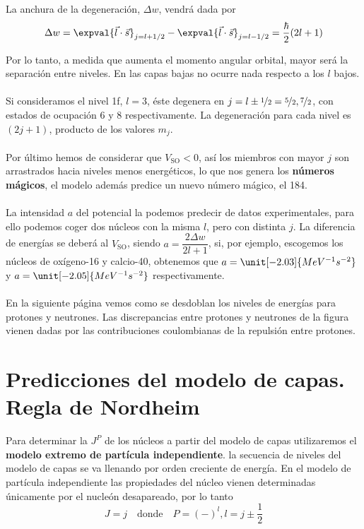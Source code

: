 La anchura de la degeneración, $\Delta w$, vendrá dada por 
\begin{equation*}
   \Delta w= \expval{\vec{l}\cdot \vec{s}}_{j=l+1/2}-\expval{\vec{l}\cdot \vec{s}}_{j=l-1/2}=\frac{\hbar}{2}(2l+1)
\end{equation*}

Por lo tanto, a medida que aumenta el momento angular orbital, mayor será la separación entre niveles. En las capas bajas no ocurre nada respecto a los $l$ bajos.\\\\ Si consideramos el nivel 1f, $l=3$, éste degenera en $j=l \pm \nicefrac{1}{2}=\nicefrac{5}{2},\nicefrac{7}{2}$, con estados de ocupación 6 y 8 respectivamente. La degeneración para cada nivel es $(2j+1)$, producto de los valores $m_j$.\\\\
Por último hemos de considerar que $V_\mathrm{SO}<0$, así los miembros con mayor $j$ son arrastrados hacia niveles menos energéticos, lo que nos genera los \textbf{números mágicos}, el modelo además predice un nuevo número mágico, el 184.\\\\ 
La intensidad $a$ del potencial la podemos predecir de datos experimentales, para ello podemos coger dos núcleos con la misma $l$, pero con distinta $j$. La diferencia de energías se deberá al $V_\mathrm{SO}$, siendo $a=\dfrac{2\Delta w}{2l+1}$, si, por ejemplo, escogemos los núcleos de oxígeno-16 y calcio-40, obtenemos que $a=\unit[-2.03]{MeV^{-1}s^{-2}}$ y $a=\unit[-2.05]{MeV^{-1}s^{-2}}$ respectivamente. \\\\
En la siguiente página vemos como se desdoblan los niveles de energías para protones y neutrones. Las discrepancias entre protones y neutrones de la figura vienen dadas por las contribuciones coulombianas de la repulsión entre protones.


\section{Predicciones del modelo de capas. Regla de Nordheim}
Para determinar la $J^P$ de los núcleos a partir del modelo de capas utilizaremos el \textbf{modelo extremo de partícula independiente}. la secuencia de niveles del modelo de capas se va llenando por orden creciente de energía. En el modelo de partícula independiente las propiedades del núcleo vienen determinadas únicamente por el nucleón desapareado, por lo tanto
\begin{equation*}
    J=j \quad \text{donde} \quad P=(-)^l, l=j\pm \frac{1}{2}
\end{equation*}

